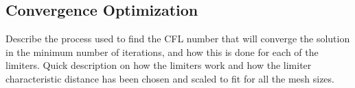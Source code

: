 
\subsection*{Convergence Optimization}
Describe the process used to find the CFL number that will converge the solution in the minimum number of iterations, and how this is done for each of the limiters. Quick description on how the limiters work and how the limiter characteristic distance has been chosen and scaled to fit for all the mesh sizes\cite{Venkatakrishnan:1993}.